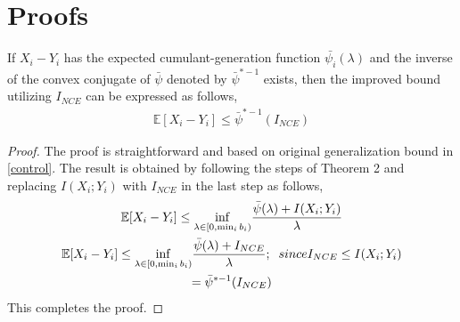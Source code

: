 \documentclass{article}
\begin{document}
\section{Proofs}
\begin{customthm}{1}
  If $X_{i}-Y_{i}$ has the expected cumulant-generation function $\bar{\psi_{i}}(\lambda)$ and the inverse of the convex conjugate of $\bar{\psi}$ denoted by $\bar{\psi}^{*-1}$ exists, then the improved bound utilizing $I_{NCE}$ can be expressed as follows,
\begin{gather}
  \mathbb{E}[X_{i} - Y_{i}] \leq \bar{\psi}^{*-1}(I_{NCE}) \nonumber
\end{gather} 
\end{customthm}
\begin{proof}
  The proof is straightforward and based on original generalization bound in \autoref{control}. The result is obtained by following the steps of Theorem 2 \cite{control} and replacing $I(X_{i};Y_{i})$ with $I_{NCE}$ in the last step as follows,
  \begin{gather}
    \mathbb{E}[X_{i} - Y_{i}] \leq \underset{\lambda \in [0,\min_{i}b_{i})}{\inf} \frac{\bar{\psi}(\lambda)+I(X_{i};Y_{i})}{\lambda} \nonumber \\
    \mathbb{E}[X_{i} - Y_{i}] \leq \underset{\lambda \in [0,\min_{i}b_{i})}{\inf} \frac{\bar{\psi}(\lambda)+I_{NCE}}{\lambda}; \;\text\;{since} I_{NCE} \leq I(X_{i};Y_{i}) \nonumber\\
    = \bar{\psi}^{*-1}(I_{NCE}) \nonumber
  \end{gather}
  This completes the proof.
\end{proof}
\end{document}
